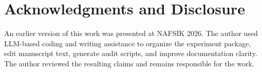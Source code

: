 \documentclass[10pt,twocolumn]{article}
\begin{document}
\section*{Acknowledgments and Disclosure}
An earlier version of this work was presented at NAFSIK 2026. The author used
LLM-based coding and writing assistance to organize the experiment package,
edit manuscript text, generate audit scripts, and improve documentation clarity.
The author reviewed the resulting claims and remains responsible for the work.



\end{document}
